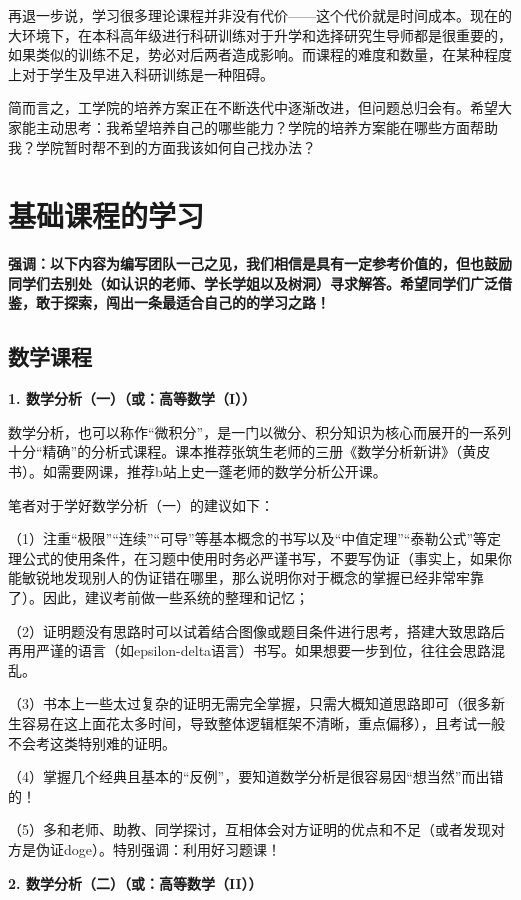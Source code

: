 \documentclass[11pt,oneside]{book}
\begin{document}
再退一步说，学习很多理论课程并非没有代价——这个代价就是时间成本。现在的大环境下，在本科高年级进行科研训练对于升学和选择研究生导师都是很重要的，如果类似的训练不足，势必对后两者造成影响。而课程的难度和数量，在某种程度上对于学生及早进入科研训练是一种阻碍。

简而言之，工学院的培养方案正在不断迭代中逐渐改进，但问题总归会有。希望大家能主动思考：我希望培养自己的哪些能力？学院的培养方案能在哪些方面帮助我？学院暂时帮不到的方面我该如何自己找办法？


    \section{基础课程的学习}
    \textbf{\textbf{强调：以下内容为编写团队一己之见，我们相信是具有一定参考价值的，但也鼓励同学们去别处（如认识的老师、学长学姐以及树洞）寻求解答。希望同学们广泛借鉴，敢于探索，闯出一条最适合自己的的学习之路！}}

\subsection{数学课程}
\textbf{1. 数学分析（一）（或：高等数学（I））}

数学分析，也可以称作“微积分”，是一门以微分、积分知识为核心而展开的一系列十分“精确”的分析式课程。课本推荐张筑生老师的三册《数学分析新讲》（黄皮书）。如需要网课，推荐b站上史一蓬老师的数学分析公开课。

笔者对于学好数学分析（一）的建议如下：

（1）注重“极限”“连续”“可导”等基本概念的书写以及“中值定理”“泰勒公式”等定理公式的使用条件，在习题中使用时务必严谨书写，不要写伪证（事实上，如果你能敏锐地发现别人的伪证错在哪里，那么说明你对于概念的掌握已经非常牢靠了）。因此，建议考前做一些系统的整理和记忆；

（2）证明题没有思路时可以试着结合图像或题目条件进行思考，搭建大致思路后再用严谨的语言（如epsilon-delta语言）书写。如果想要一步到位，往往会思路混乱。

（3）书本上一些太过复杂的证明无需完全掌握，只需大概知道思路即可（很多新生容易在这上面花太多时间，导致整体逻辑框架不清晰，重点偏移），且考试一般不会考这类特别难的证明。

（4）掌握几个经典且基本的“反例”，要知道数学分析是很容易因“想当然”而出错的！

（5）多和老师、助教、同学探讨，互相体会对方证明的优点和不足（或者发现对方是伪证doge）。特别强调：利用好习题课！

 \textbf{2. 数学分析（二）（或：高等数学（II））}
\end{document}
